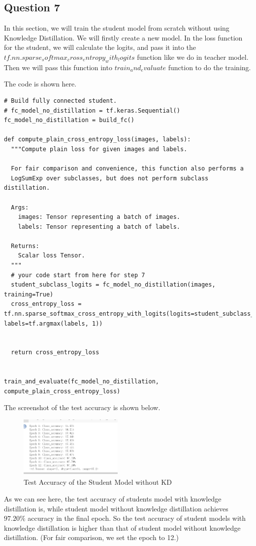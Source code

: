 \documentclass[conference]{IEEEtran}
\begin{document}
\subsection{Question 7}
In this section, we will train the student model from scratch without using Knowledge Distillation.
We will firstly create a new model. In the loss function for the student, we will calculate the logits, and pass it into the $tf.nn.sparse_softmax_cross_entropy_with_logits$ function like we do in teacher model.
Then we will pass this function into $train_and_evaluate$ function to do the training.\par
The code is shown here.
\begin{lstlisting}
# Build fully connected student.
# fc_model_no_distillation = tf.keras.Sequential()
fc_model_no_distillation = build_fc()

def compute_plain_cross_entropy_loss(images, labels):
  """Compute plain loss for given images and labels.

  For fair comparison and convenience, this function also performs a
  LogSumExp over subclasses, but does not perform subclass distillation.

  Args:
    images: Tensor representing a batch of images.
    labels: Tensor representing a batch of labels.

  Returns:
    Scalar loss Tensor.
  """
  # your code start from here for step 7
  student_subclass_logits = fc_model_no_distillation(images, training=True)
  cross_entropy_loss = tf.nn.sparse_softmax_cross_entropy_with_logits(logits=student_subclass_logits, labels=tf.argmax(labels, 1))

  
  return cross_entropy_loss


train_and_evaluate(fc_model_no_distillation, compute_plain_cross_entropy_loss)
\end{lstlisting}
The screenshot of the test accuracy is shown below.

\begin{figure}[h] 
    \centering
    \includegraphics[width=0.45\textwidth]{./graphs/T1Q7_train.png}
    \caption{Test Accuracy of the Student Model without KD}
    \label{Fig.t1q3e}
\end{figure}
As we can see here, the test accuracy of students model with knowledge distillation is, while student model without knowledge distillation achieves $97.20\%$ accuracy in the final epoch.
So the test accuracy of student models with knowledge distillation is higher than that of student model without knowledge distillation. (For fair comparison, we set the epoch to 12.)
\end{document}
